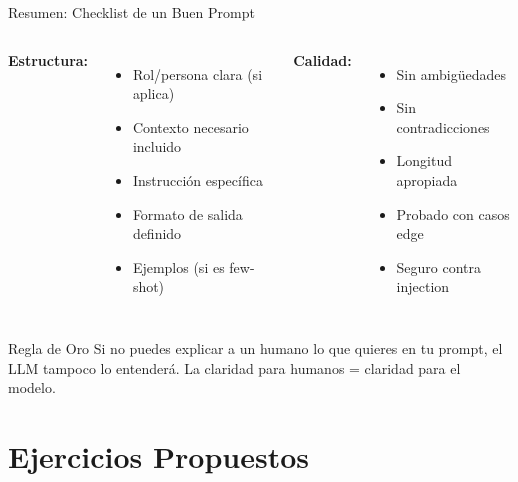 \documentclass[aspectratio=169]{beamer}
\begin{document}
\begin{frame}{Resumen: Checklist de un Buen Prompt}
    \begin{columns}[t]
        \textbf{Estructura:}
        \begin{itemize}
            \item[$\square$] Rol/persona clara (si aplica)
            \item[$\square$] Contexto necesario incluido
            \item[$\square$] Instrucción específica
            \item[$\square$] Formato de salida definido
            \item[$\square$] Ejemplos (si es few-shot)
        \end{itemize}
        
        \textbf{Calidad:}
        \begin{itemize}
            \item[$\square$] Sin ambigüedades
            \item[$\square$] Sin contradicciones
            \item[$\square$] Longitud apropiada
            \item[$\square$] Probado con casos edge
            \item[$\square$] Seguro contra injection
        \end{itemize}
    \end{columns}
    
    \vspace{0.4cm}
    \begin{block}{Regla de Oro}
        Si no puedes explicar a un humano lo que quieres en tu prompt, el LLM tampoco lo entenderá. La claridad para humanos = claridad para el modelo.
    \end{block}
\end{frame}

\section{Ejercicios Propuestos}
\end{document}
